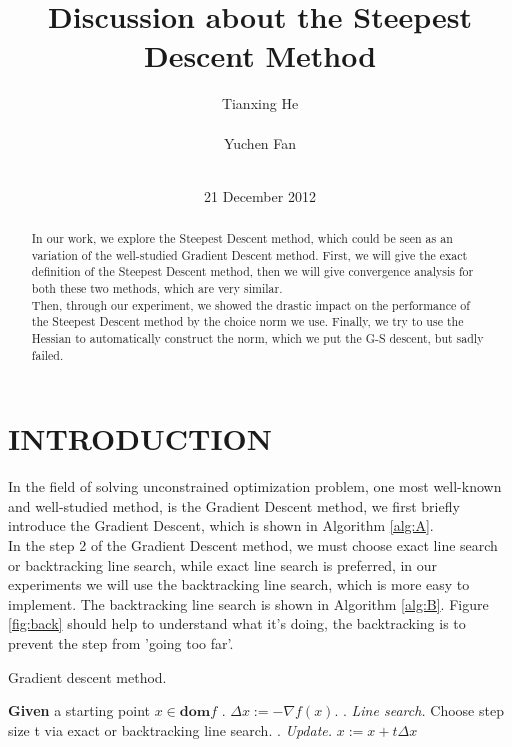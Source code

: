 \documentclass{acm_proc_article-sp}
\begin{document}
\title{Discussion about the Steepest Descent Method}



\author{
\alignauthor
Tianxing He\\
       \\
\alignauthor
Yuchen Fan\\
       \\
}
\date{21 December 2012}

\maketitle
\begin{abstract}
In our work, we explore the Steepest Descent method, which could be seen as an variation of the well-studied Gradient Descent method. First, we will give the exact definition of the Steepest Descent method, then we will give convergence analysis for both these two methods, which are very similar. \\
Then, through our experiment, we showed the drastic impact on the performance of the Steepest Descent method by the choice norm we use. Finally, we try to use the Hessian to automatically construct the norm, which we put the G-S descent, but sadly failed.
\end{abstract}


\section{INTRODUCTION}
In the field of solving unconstrained optimization problem, one most well-known and well-studied method, is the Gradient Descent method, we first briefly introduce the Gradient Descent, which is shown in Algorithm \ref{alg:A}.\\
In the step 2 of the Gradient Descent method, we must choose exact line search or backtracking line search, while exact line search is preferred, in our experiments we will use the backtracking line search, which is more easy to implement. The backtracking line search is shown in Algorithm \ref{alg:B}. Figure \ref{fig:back} should help to understand what it's doing, the backtracking is to prevent the step from 'going too far'.
\begin{algorithm}\caption{\label{alg:A}Gradient descent method.}
\begin{algorithmic}
\STATE \textbf{Given} a starting point $x \in \textbf{dom} f$
\REPEAT
{}. $\Delta x:=-\nabla f\left( x\right) $.
. \textit{Line search.} Choose step size t via exact or backtracking line search.
. \textit{Update.} $x:=x+t\Delta x$
\end{algorithmic}
\end{algorithm}
\end{document}
